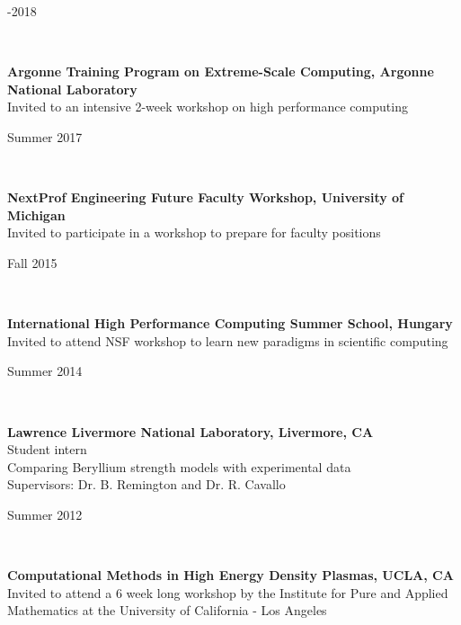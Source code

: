\documentclass[11pt,letterpaper]{article}
\begin{document}
\begin{minipage}[t]{0.15\textwidth}-2018%
\end{minipage}\\[2ex]%
\begin{minipage}[t]{0.82\textwidth}%
  \textbf{Argonne Training Program on Extreme-Scale Computing, Argonne National Laboratory}\\%
  Invited to an intensive 2-week workshop on high performance computing%
\end{minipage}\hfill%
\begin{minipage}[t]{0.15\textwidth}\flushright%
  Summer 2017%
\end{minipage}\\[2ex]%
\begin{minipage}[t]{0.82\textwidth}%
  \textbf{NextProf Engineering Future Faculty Workshop, University of Michigan}\\%
  Invited to participate in a workshop to prepare for faculty positions%
\end{minipage}\hfill%
\begin{minipage}[t]{0.15\textwidth}\flushright%
  Fall 2015%
\end{minipage}\\[2ex]%
\begin{minipage}[t]{0.82\textwidth}%
  \textbf{International High Performance Computing Summer School, Hungary}\\%
  Invited to attend NSF workshop to learn new paradigms in scientific computing%
\end{minipage}\hfill%
\begin{minipage}[t]{0.15\textwidth}\flushright%
  Summer 2014%
\end{minipage}\\[2ex]%
\begin{minipage}[t]{0.82\textwidth}%
  \textbf{Lawrence Livermore National Laboratory, Livermore, CA}\\%
  Student intern\\%
  Comparing Beryllium strength models with experimental data\\%
  Supervisors: Dr. B. Remington and Dr. R. Cavallo%
\end{minipage}\hfill%
\begin{minipage}[t]{0.15\textwidth}\flushright%
  Summer 2012%
\end{minipage}\\[2ex]%
\begin{minipage}[t]{0.82\textwidth}%
  \textbf{Computational Methods in High Energy Density Plasmas, UCLA, CA}\\%
  Invited to attend a 6 week long workshop by the Institute for Pure and Applied Mathematics at the University of California - Los Angeles%
\end{minipage}\hfill%
\end{document}
